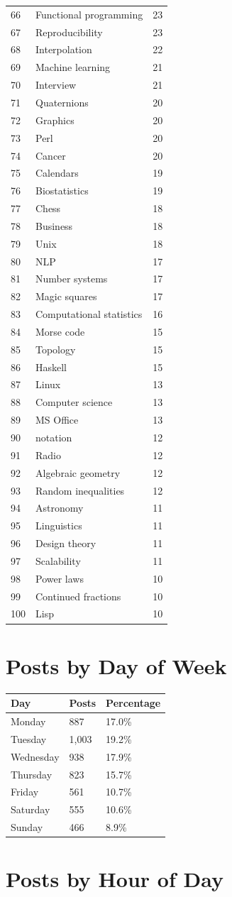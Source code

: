 \begin{longtable}{p{3.00cm}p{3.00cm}p{3.00cm}}
66 & Functional programming & 23 \tabularnewline
67 & Reproducibility & 23 \tabularnewline
68 & Interpolation & 22 \tabularnewline
69 & Machine learning & 21 \tabularnewline
70 & Interview & 21 \tabularnewline
71 & Quaternions & 20 \tabularnewline
72 & Graphics & 20 \tabularnewline
73 & Perl & 20 \tabularnewline
74 & Cancer & 20 \tabularnewline
75 & Calendars & 19 \tabularnewline
76 & Biostatistics & 19 \tabularnewline
77 & Chess & 18 \tabularnewline
78 & Business & 18 \tabularnewline
79 & Unix & 18 \tabularnewline
80 & NLP & 17 \tabularnewline
81 & Number systems & 17 \tabularnewline
82 & Magic squares & 17 \tabularnewline
83 & Computational statistics & 16 \tabularnewline
84 & Morse code & 15 \tabularnewline
85 & Topology & 15 \tabularnewline
86 & Haskell & 15 \tabularnewline
87 & Linux & 13 \tabularnewline
88 & Computer science & 13 \tabularnewline
89 & MS Office & 13 \tabularnewline
90 & notation & 12 \tabularnewline
91 & Radio & 12 \tabularnewline
92 & Algebraic geometry & 12 \tabularnewline
93 & Random inequalities & 12 \tabularnewline
94 & Astronomy & 11 \tabularnewline
95 & Linguistics & 11 \tabularnewline
96 & Design theory & 11 \tabularnewline
97 & Scalability & 11 \tabularnewline
98 & Power laws & 10 \tabularnewline
99 & Continued fractions & 10 \tabularnewline
100 & Lisp & 10 \tabularnewline
\bottomrule
\end{longtable}

\bigskip

\section*{Posts by Day of Week}

\begin{longtable}{p{3.00cm}p{3.00cm}p{3.00cm}}
\toprule
\textbf{Day} & \textbf{Posts} & \textbf{Percentage} \tabularnewline
\midrule
Monday & 887 & 17.0\% \tabularnewline
Tuesday & 1,003 & 19.2\% \tabularnewline
Wednesday & 938 & 17.9\% \tabularnewline
Thursday & 823 & 15.7\% \tabularnewline
Friday & 561 & 10.7\% \tabularnewline
Saturday & 555 & 10.6\% \tabularnewline
Sunday & 466 & 8.9\% \tabularnewline
\bottomrule
\end{longtable}

\bigskip

\section*{Posts by Hour of Day}

